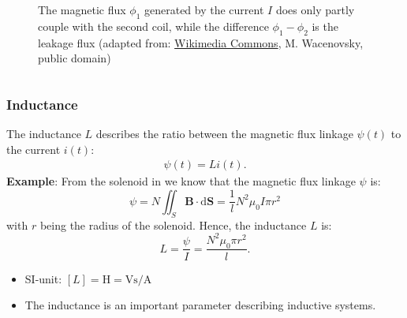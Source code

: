 \begin{frame}
\begin{columns}
\begin{column}{0.48\textwidth}
\begin{figure}
				\caption{The magnetic flux $\phi_1$ generated by the current $I$ does only partly couple with the second coil, while the difference $\phi_1-\phi_2$ is the leakage flux (adapted from: \href{https://commons.wikimedia.org/wiki/File:Mutual_Inductivity.svg}{Wikimedia Commons}, M. Wacenovsky, public domain)}
			\end{figure}
		\end{column}
		\end{columns}
\end{frame}

\begin{frame}
	\frametitle{Inductance}
	The inductance $L$ describes the ratio between the magnetic flux linkage $\psi(t)$ to the current $i(t)$:
    \begin{align}
        \psi(t) = L i(t).
    \end{align}
    \pause
    \textbf{Example}:  From the solenoid in  we know that the magnetic flux linkage $\psi$ is:
    $$\psi = N \iint_{S} \bm{B} \cdot \mathrm{d}\bm{S}= \frac{1}{l}N^2 \mu_0 I \pi r^2 $$
    with $r$ being the radius of the solenoid. \pause Hence, the inductance $L$ is:
    $$L = \frac{\psi}{I} = \frac{N^2 \mu_0 \pi r^2}{l}.$$
    \begin{itemize}
        \item SI-unit: $[L] = \si{\henry} = \si{\volt\second\per\ampere}$
        \item The inductance is an important parameter describing inductive systems.
    \end{itemize}
\end{frame}


